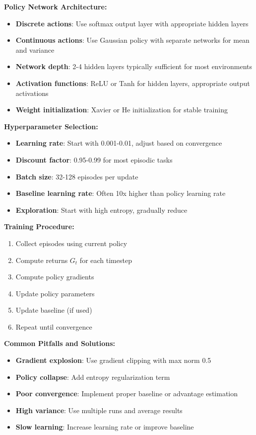 \documentclass[12pt]{article}
\begin{document}
{{{\textbf{Policy Network Architecture:}
\begin{itemize}
    \item \textbf{Discrete actions}: Use softmax output layer with appropriate hidden layers
    \item \textbf{Continuous actions}: Use Gaussian policy with separate networks for mean and variance
    \item \textbf{Network depth}: 2-4 hidden layers typically sufficient for most environments
    \item \textbf{Activation functions}: ReLU or Tanh for hidden layers, appropriate output activations
    \item \textbf{Weight initialization}: Xavier or He initialization for stable training
\end{itemize}

\textbf{Hyperparameter Selection:}
\begin{itemize}
    \item \textbf{Learning rate}: Start with 0.001-0.01, adjust based on convergence
    \item \textbf{Discount factor}: 0.95-0.99 for most episodic tasks
    \item \textbf{Batch size}: 32-128 episodes per update
    \item \textbf{Baseline learning rate}: Often 10x higher than policy learning rate
    \item \textbf{Exploration}: Start with high entropy, gradually reduce
\end{itemize}

\textbf{Training Procedure:}
\begin{enumerate}
    \item Collect episodes using current policy
    \item Compute returns $G_t$ for each timestep
    \item Compute policy gradients
    \item Update policy parameters
    \item Update baseline (if used)
    \item Repeat until convergence
\end{enumerate}

\textbf{Common Pitfalls and Solutions:}
\begin{itemize}
    \item \textbf{Gradient explosion}: Use gradient clipping with max norm 0.5
    \item \textbf{Policy collapse}: Add entropy regularization term
    \item \textbf{Poor convergence}: Implement proper baseline or advantage estimation
    \item \textbf{High variance}: Use multiple runs and average results
    \item \textbf{Slow learning}: Increase learning rate or improve baseline
\end{itemize}

}}}
\end{document}
